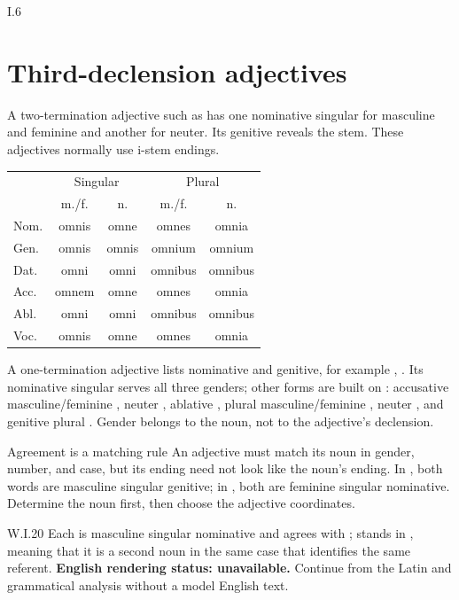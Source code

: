 \begin{courseunit}{I.6}
\section{Third-declension adjectives}

A two-termination adjective such as  has one nominative
singular for masculine and feminine and another for neuter. Its genitive
 reveals the stem. These adjectives normally use i-stem endings.

\begin{center}\scriptsize
\begin{tabular}{@{}lcc|cc@{}}
\toprule
& \multicolumn{2}{c}{Singular} & \multicolumn{2}{c}{Plural} \\
& m./f. & n. & m./f. & n. \\
\midrule
Nom. & omnis & omne & omnes & omnia \\
Gen. & omnis & omnis & omnium & omnium \\
Dat. & omni & omni & omnibus & omnibus \\
Acc. & omnem & omne & omnes & omnia \\
Abl. & omni & omni & omnibus & omnibus \\
Voc. & omnis & omne & omnes & omnia \\
\bottomrule
\end{tabular}
\end{center}

A one-termination adjective lists nominative and genitive, for example
, . Its nominative singular 
serves all three genders; other forms are built on :
accusative masculine/feminine , neuter , ablative
, plural masculine/feminine , neuter
, and genitive plural . Gender belongs to the
noun, not to the adjective's declension.

\begin{grammarbox}{Agreement is a matching rule}
An adjective must match its noun in gender, number, and case, but its ending
need not look like the noun's ending. In , both
words are masculine singular genitive; in , both are
feminine singular nominative. Determine the noun first, then choose the
adjective coordinates.
\end{grammarbox}

\begin{workedexample}{}{W.I.20}
Each  is masculine singular nominative and agrees with
;  stands in , meaning that it is
a second noun in the same case that identifies the same referent.
\textbf{English rendering status: unavailable.} Continue from the Latin and
grammatical analysis without a model English text.
\end{workedexample}


\end{courseunit}
